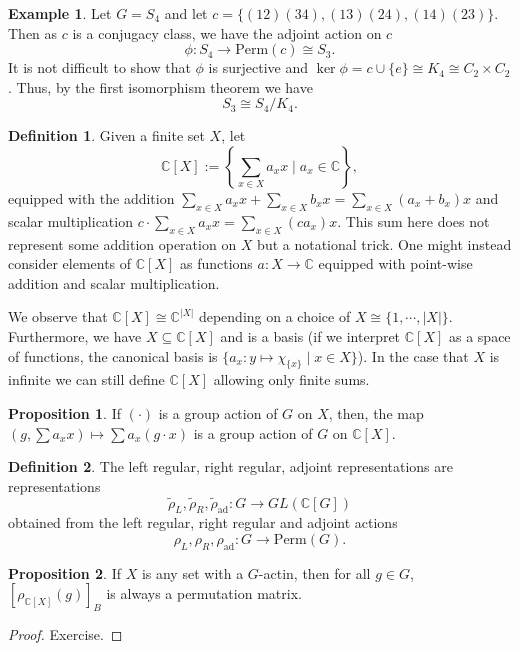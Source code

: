 \documentclass[]{article}
\theoremstyle{definition}
\theoremstyle{definition}
\newtheorem{definition}{Definition}[section]
\newtheorem{proposition}{Proposition}[section]
\newtheorem{example}{Example}[section]
\begin{document}
\begin{example}
  Let \(G = S_4\) and let \(c = \{(12)(34), (13)(24), (14)(23)\}\). Then 
  as \(c\) is a conjugacy class, we have the adjoint action on \(c\) 
  \[\phi : S_4 \to \text{Perm}(c) \cong S_3.\]
  It is not difficult to show that \(\phi\) is surjective and 
  \(\ker \phi = c \cup \{e\} \cong K_4 \cong C_2 \times C_2\). Thus, 
  by the first isomorphism theorem we have 
  \[S_3 \cong S_4 / K_4.\]
\end{example}

\begin{definition}
  Given a finite set \(X\), let 
  \[\mathbb{C}[X] := \left\{\sum_{x \in X} a_x x \mid a_x 
    \in \mathbb{C}\right\},\]
  equipped with the addition 
  \(\sum_{x \in X} a_x x + \sum_{x \in X} b_x x = 
   \sum_{x \in X} (a_x + b_x) x\) and scalar multiplication 
   \(c \cdot \sum_{x \in X} a_x x = \sum_{x \in X} (c a_x) x\).
  This sum here does not represent some addition operation on \(X\) but a 
  notational trick. One might instead consider elements of \(\mathbb{C}[X]\) 
  as functions \(a : X \to \mathbb{C}\) equipped with point-wise addition and 
  scalar multiplication.
\end{definition}

We observe that \(\mathbb{C}[X] \cong \mathbb{C}^{|X|}\) depending on a 
choice of \(X \cong \{1, \cdots, |X|\}\). Furthermore, we have 
\(X \subseteq \mathbb{C}[X]\) and is a basis (if we interpret \(\mathbb{C}[X]\) 
as a space of functions, the canonical basis is 
\(\{a_x : y \mapsto \chi_{\{x\}} \mid x \in X\}\)). 
In the case that \(X\) is infinite we can still define \(\mathbb{C}[X]\) 
allowing only finite sums.

\begin{proposition}
  If \((\cdot)\) is a group action of \(G\) on \(X\), then,
  the map \((g, \sum a_x x) \mapsto \sum a_x (g \cdot x)\) is a 
  group action of \(G\) on \(\mathbb{C}[X]\).
\end{proposition}

\begin{definition}
  The left regular, right regular, adjoint representations are representations 
  \[\tilde \rho_L, \tilde \rho_R, \tilde \rho_{\text{ad}} :
    G \to GL(\mathbb{C}[G])\] 
  obtained from the left regular, right regular and adjoint actions 
  \[\rho_L, \rho_R, \rho_{\text{ad}} :
    G \to \text{Perm}(G).\] 
\end{definition}

\begin{proposition}
  If \(X\) is any set with a \(G\)-actin, then for all \(g \in G\), 
  \([\rho_{\mathbb{C}[X]}(g)]_B\) is always a permutation matrix.
\end{proposition}
\begin{proof}
  Exercise.
\end{proof}
\end{document}
